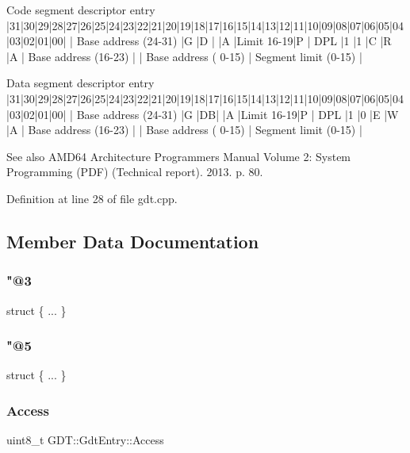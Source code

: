 \begin{DoxyVerb}Code segment descriptor entry
|31|30|29|28|27|26|25|24|23|22|21|20|19|18|17|16|15|14|13|12|11|10|09|08|07|06|05|04|03|02|01|00|
| Base address (24-31)  |G |D |  |A |Limit 16-19|P | DPL |1 |1 |C |R |A | Base address (16-23)  |
| Base address ( 0-15)                          |                         Segment limit (0-15)  |

Data segment descriptor entry
|31|30|29|28|27|26|25|24|23|22|21|20|19|18|17|16|15|14|13|12|11|10|09|08|07|06|05|04|03|02|01|00|
| Base address (24-31)  |G |DB|  |A |Limit 16-19|P | DPL |1 |0 |E |W |A | Base address (16-23)  |
| Base address ( 0-15)                          |                         Segment limit (0-15)  |
\end{DoxyVerb}
 \begin{DoxySeeAlso}{See also}
A\+M\+D64 Architecture Programmer\textquotesingle{}s Manual Volume 2\+: System Programming (P\+DF) (Technical report). 2013. p. 80. 
\end{DoxySeeAlso}


Definition at line 28 of file gdt.\+cpp.



\subsection{Member Data Documentation}
\mbox{\label{union_g_d_t_1_1_gdt_entry_a269676ff24ab8fa05e0b639a2f7052ab}} 
\subsubsection{\texorpdfstring{"@3}{@3}}
{\footnotesize\ttfamily struct \{ ... \} }

\mbox{\label{union_g_d_t_1_1_gdt_entry_abdf4ae2451059ac8ee245da418292c89}} 
\subsubsection{\texorpdfstring{"@5}{@5}}
{\footnotesize\ttfamily struct \{ ... \} }

\mbox{\label{union_g_d_t_1_1_gdt_entry_a9e362a6b3aad509ffc6620df7d3bca21}} 
\subsubsection{\texorpdfstring{Access}{Access}}
{\footnotesize\ttfamily uint8\+\_\+t G\+D\+T\+::\+Gdt\+Entry\+::\+Access}



